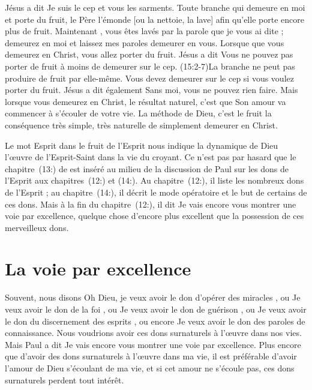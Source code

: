 Jésus a dit\frcolon{} \Og Je suis le cep et vous les sarments.
 Toute branche qui demeure en moi et porte du fruit,
 le Père l'émonde [ou la nettoie, la lave] afin qu'elle porte
 encore plus de fruit. Maintenant , vous êtes lavés par la parole
 que je vous ai dite ; demeurez en moi et laissez mes paroles
 demeurer en vous. \Fg{}
 Lorsque que vous demeurez en Christ, vous allez porter du fruit.
 Jésus a dit\frcolon{} \Og Vous ne pouvez pas porter de fruit à moins
 de demeurer sur le cep. \Fg{} (15:2-7)La branche
 ne peut pas produire de fruit par elle-même.
 Vous devez demeurer sur le cep si vous voulez porter du fruit.
 Jésus a dit également\frcolon{} \Og Sans moi, vous ne pouvez rien faire. \Fg{}
 Mais lorsque vous demeurez en Christ, le résultat naturel,
 c'est que Son amour va commencer à s'écouler de votre vie.
 La méthode de Dieu, c'est le fruit \ocadr la conséquence très simple,
 très naturelle de simplement demeurer en Christ.

Le mot \Og Esprit \Fg{} dans \Og le fruit de l'Esprit \Fg{}
 nous indique la dynamique de Dieu \ocadr l'œuvre de l'Esprit-Saint
 dans la vie du croyant. Ce n'est pas par hasard que le
 chapitre~(13:) de  est inséré
 au milieu de la discussion de Paul sur les dons de l'Esprit
 aux chapitres~(12:) et (14:).
 Au chapitre~(12:), il liste les nombreux dons de l'Esprit ;
 au chapitre~(14:), il décrit le mode opératoire
 et le but de certains de ces dons.
 Mais à la fin du chapitre~(12:), il dit\frcolon{}
 \Og Je vais encore vous montrer une voie par excellence, \Fg{}
 quelque chose d'encore plus excellent que la possession de ces merveilleux dons.


\section{La voie par excellence}

Souvent, nous disons\frcolon{}
 \Og Oh Dieu, je veux avoir le don d'opérer des miracles \Fg{}, ou\frcolon{}
 \Og Je veux avoir le don de la foi \Fg{}, ou\frcolon{}
 \Og Je veux avoir le don de guérison \Fg{}, ou\frcolon{}
 \Og Je veux avoir le don du discernement des esprits \Fg{}, ou encore\frcolon{}
 \Og Je veux avoir le don des paroles de connaissance. \Fg{}
 Nous voudrions avoir ces dons surnaturels à l'œuvre dans nos vies.
 Mais Paul a dit\frcolon{}
 \Og Je vais encore vous montrer une voie par excellence. \Fg{}
 Plus encore que d'avoir des dons surnaturels à l'œuvre dans ma vie,
 il est préférable d'avoir l'amour de Dieu s'écoulant de ma vie,
 et si cet amour ne s'écoule pas, ces dons surnaturels perdent tout intérêt.

